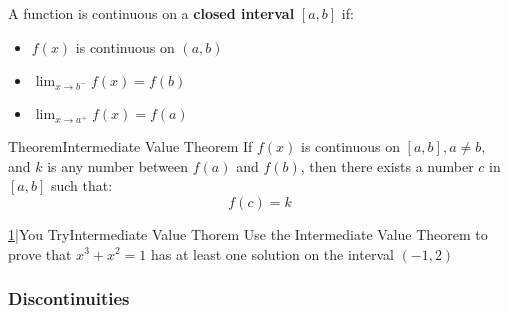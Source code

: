 \documentclass{MathNotes}
\newenvironment{theorem}[1]{\begin{GrayBox}{Theorem}{#1}}{\end{GrayBox}}
\newenvironment{practice}[2]{\begin{PurpleBox}{\texorpdfstring{#1}\Big|You Try}{#2}}{\end{PurpleBox}}
\begin{document}
A function is continuous on a \textbf{closed interval} $[a, b]$ if:
\begin{itemize}
	\item $f(x)$ is continuous on $(a, b)$
	\item $\lim_{x\to b^-}f(x)=f(b)$
	\item $\lim_{x\to a^+}f(x)=f(a)$
\end{itemize}

\begin{theorem}{Intermediate Value Theorem}
	If $f(x)$ is continuous on $[a, b], a\neq b$, and $k$ is any number
	between $f(a)$ and $f(b)$, then there exists a number $c$ in
	$[a, b]$ such that: $$f(c)=k$$
\end{theorem}

\begin{practice}{\hyperref[ans:1.3.1-1]{1}}{Intermediate Value Thorem}
	\label{prac:1.3.1-1}
	Use the Intermediate Value Theorem to prove that $x^3+x^2=1$ has at least
	one solution on the interval $(-1, 2)$
\end{practice}

\subsubsection{Discontinuities}
\end{document}
